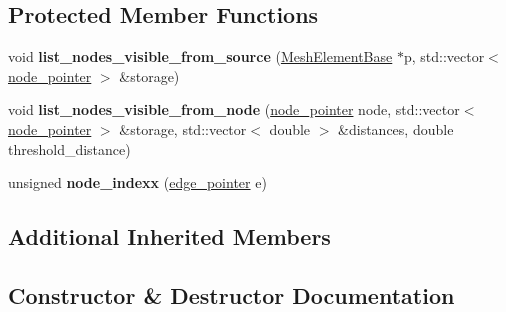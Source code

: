 \subsection*{Protected Member Functions}
\begin{DoxyCompactItemize}
\item 
\hypertarget{classgeodesic_1_1_geodesic_algorithm_subdivision_ac48be36945b8d18a28cafa0a45bcdf75}{}void {\bfseries list\+\_\+nodes\+\_\+visible\+\_\+from\+\_\+source} (\hyperlink{classgeodesic_1_1_mesh_element_base}{Mesh\+Element\+Base} $\ast$p, std\+::vector$<$ \hyperlink{classgeodesic_1_1_subdivision_node}{node\+\_\+pointer} $>$ \&storage)\label{classgeodesic_1_1_geodesic_algorithm_subdivision_ac48be36945b8d18a28cafa0a45bcdf75}

\item 
\hypertarget{classgeodesic_1_1_geodesic_algorithm_subdivision_a35c3361a19ac215d890a8e51e31f0ca4}{}void {\bfseries list\+\_\+nodes\+\_\+visible\+\_\+from\+\_\+node} (\hyperlink{classgeodesic_1_1_subdivision_node}{node\+\_\+pointer} node, std\+::vector$<$ \hyperlink{classgeodesic_1_1_subdivision_node}{node\+\_\+pointer} $>$ \&storage, std\+::vector$<$ double $>$ \&distances, double threshold\+\_\+distance)\label{classgeodesic_1_1_geodesic_algorithm_subdivision_a35c3361a19ac215d890a8e51e31f0ca4}

\item 
\hypertarget{classgeodesic_1_1_geodesic_algorithm_subdivision_a963cf8fddfb3a934be163e4db979ea65}{}unsigned {\bfseries node\+\_\+indexx} (\hyperlink{classgeodesic_1_1_edge}{edge\+\_\+pointer} e)\label{classgeodesic_1_1_geodesic_algorithm_subdivision_a963cf8fddfb3a934be163e4db979ea65}

\end{DoxyCompactItemize}
\subsection*{Additional Inherited Members}


\subsection{Constructor \& Destructor Documentation}
\hypertarget{classgeodesic_1_1_geodesic_algorithm_subdivision_a72dacc31bf5f71a59ab7af93d9f798a9}{}
